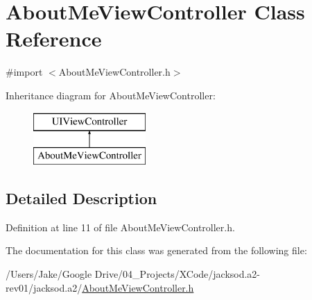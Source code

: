 \hypertarget{interface_about_me_view_controller}{\section{About\+Me\+View\+Controller Class Reference}
\label{interface_about_me_view_controller}
}


{\ttfamily \#import $<$About\+Me\+View\+Controller.\+h$>$}

Inheritance diagram for About\+Me\+View\+Controller\+:\begin{figure}[H]
\begin{center}
\leavevmode
\includegraphics[height=2.000000cm]{interface_about_me_view_controller}
\end{center}
\end{figure}


\subsection{Detailed Description}


Definition at line 11 of file About\+Me\+View\+Controller.\+h.



The documentation for this class was generated from the following file\+:\begin{DoxyCompactItemize}
\item 
/\+Users/\+Jake/\+Google Drive/04\+\_\+\+Projects/\+X\+Code/jacksod.\+a2-\/rev01/jacksod.\+a2/\hyperlink{_about_me_view_controller_8h}{About\+Me\+View\+Controller.\+h}\end{DoxyCompactItemize}
